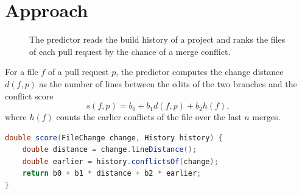 \section{Approach}
\begin{figure}[t]
\centering
{}
\caption{\sizeofcaptions The predictor reads the build history of a project and ranks the files of each pull request
by the chance of a merge conflict.}
\label{fig:overview}
\end{figure}
For a file $f$ of a pull request $p$, the predictor computes the change distance $d(f, p)$ as the number of lines
between the edits of the two branches and the conflict score
\begin{equation}
s(f, p) = b_0 + b_1 d(f, p) + b_2 h(f),
\end{equation}
where $h(f)$ counts the earlier conflicts of the file over the last $n$ merges.
\lipsum[19-22]
\begin{lstlisting}[language=Java,basicstyle=\ttfamily\sizeoflisting]
double score(FileChange change, History history) {
    double distance = change.lineDistance();
    double earlier = history.conflictsOf(change);
    return b0 + b1 * distance + b2 * earlier;
}
\end{lstlisting}
\lipsum[23-25]

